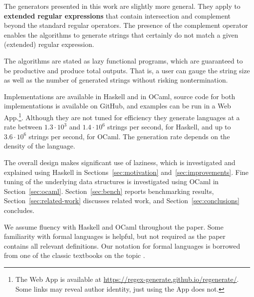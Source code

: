 The generators presented in this work are slightly more general. They
apply to \textbf{extended regular expressions} that contain
intersection and complement beyond the standard regular operators. The presence
of the complement operator enables the algorithms to generate strings
that certainly do not match a given (extended) regular expression.

The algorithms are stated as lazy functional programs, which are guaranteed to be productive and
produce total outputs. That is, a user can gauge the string size as
well as the number of generated strings without risking nontermination.

Implementations are available in Haskell and in OCaml, source code for
both implementations is available on GitHub, and examples can be run
in a Web App.\footnote{%
  The Web App is available at
  \url{https://regex-generate.github.io/regenerate/}.  Some links may
  reveal author identity, just using the App does not.  }.  Although
they are not tuned for efficiency they generate languages at a rate
between $1.3\cdot10^3$ and $1.4\cdot10^6$ strings per second, for
Haskell, and up to $3.6\cdot10^6$ strings per second, for OCaml. The
generation rate depends on the density of the language.

The overall design makes significant use of laziness, which is
investigated and explained using Haskell in
Sections~\ref{sec:motivation} and~\ref{sec:improvements}. Fine tuning
of the underlying data structures is investigated using OCaml in
Section~\ref{sec:ocaml}.  Section~\ref{sec:bench} reports benchmarking
results, Section~\ref{sec:related-work} discusses related work, and
Section~\ref{sec:conclusions} concludes.

We assume fluency with Haskell and OCaml throughout the paper.  Some
familiarity with formal languages is helpful, but not required as the
paper contains all relevant definitions. Our notation for formal
languages is borrowed from one of the classic textbooks on the topic
\cite{DBLP:books/daglib/0011126}.

